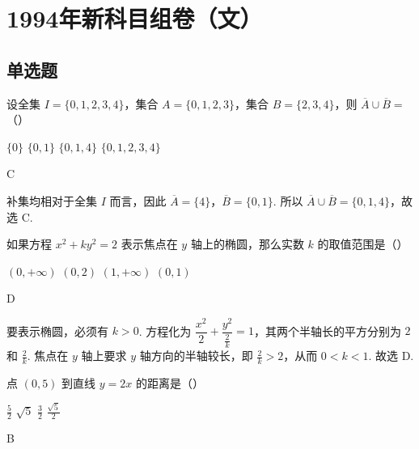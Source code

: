 \chapter{1994年新科目组卷（文）}
\section{单选题}

\begin{problem}
设全集 \(I = \{0, 1, 2, 3, 4\}\)，集合 \(A = \{0, 1, 2, 3\}\)，集合 \(B = \{2, 3, 4\}\)，则 \(\overline{A} \cup \overline{B} =\)（\quad）

\choices
    {\(\{0\} \)}
    {\(\{0,1\}\)}
    {\(\{0,1,4\}\)}
    {\(\{0,1,2,3,4\}\)}
\end{problem}

\begin{answer}
C
\end{answer}

\begin{solution}
补集均相对于全集 \(I\) 而言，因此 \(\overline{A}=\{4\}\)，\(\overline{B}=\{0,1\}\). 所以 \(\overline{A}\cup\overline{B}=\{0,1,4\}\)，故选 C.
\end{solution}

\begin{problem}
如果方程 \(x^{2} + ky^{2} = 2\) 表示焦点在 \(y\) 轴上的椭圆，那么实数 \(k\) 的取值范围是（\quad）

\choices
    {\((0, +\infty)\)}
    {\((0,2)\)}
    {\((1, +\infty)\)}
    {\((0,1)\)}
\end{problem}

\begin{answer}
D
\end{answer}

\begin{solution}
要表示椭圆，必须有 \(k>0\). 方程化为 \(\dfrac{x^{2}}{2}+\dfrac{y^{2}}{\frac{2}{k}}=1\)，其两个半轴长的平方分别为 \(2\) 和 \(\frac{2}{k}\). 焦点在 \(y\) 轴上要求 \(y\) 轴方向的半轴较长，即 \(\frac{2}{k}>2\)，从而 \(0<k<1\). 故选 D.
\end{solution}

\begin{problem}
点 \((0,5)\) 到直线 \(y=2x\) 的距离是（\quad）

\choices
    {\(\frac{5}{2}\)}
    {\(\sqrt{5}\)}
    {\(\frac{3}{2}\)}
    {\(\frac{\sqrt{5}}{2}\)}
\end{problem}

\begin{answer}
B
\end{answer}

